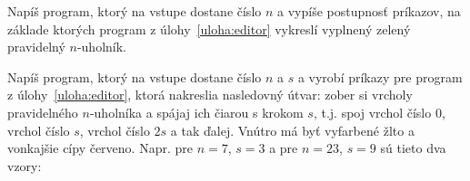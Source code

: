 \begin{uloha}
  Napíš program, ktorý na vstupe dostane číslo $n$ a vypíše postupnosť príkazov, na základe
  ktorých program z úlohy~\ref{uloha:editor} vykreslí vyplnený zelený pravidelný $n$-uholník.
\end{uloha}

\begin{uloha}
  Napíš program, ktorý na vstupe dostane číslo $n$ a $s$ a vyrobí príkazy pre program z 
  úlohy~\ref{uloha:editor}, ktorá nakreslia nasledovný útvar: zober si vrcholy pravidelného
  $n$-uholníka a spájaj ich čiarou s krokom $s$, t.j. spoj vrchol číslo $0$, 
  vrchol číslo $s$, vrchol číslo $2s$ a tak ďalej.
  Vnútro má byť vyfarbené žlto a vonkajšie cípy červeno. Napr. pre $n=7$, $s=3$ a pre
  $n=23$, $s=9$ sú tieto dva vzory:

  {
  \setlength{\fboxsep}{0pt}
  \begin{column}{0.45}
  \centerline{}
  \end{column}\hfill
  \begin{column}{0.45}

\end{column}}
\end{uloha}
